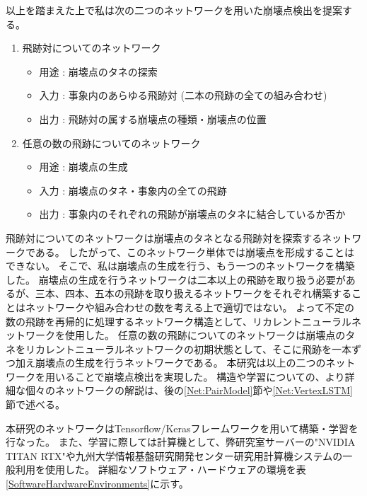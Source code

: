 以上を踏まえた上で私は次の二つのネットワークを用いた崩壊点検出を提案する。

\begin{enumerate}
 \item 飛跡対についてのネットワーク
 \begin{itemize}
  \item 用途 : 崩壊点のタネの探索
  \item 入力 : 事象内のあらゆる飛跡対 (二本の飛跡の全ての組み合わせ)
  \item 出力 : 飛跡対の属する崩壊点の種類・崩壊点の位置
 \end{itemize}
 \item 任意の数の飛跡についてのネットワーク
 \begin{itemize}
  \item 用途 : 崩壊点の生成
  \item 入力 : 崩壊点のタネ・事象内の全ての飛跡
  \item 出力 : 事象内のそれぞれの飛跡が崩壊点のタネに結合しているか否か
 \end{itemize}
\end{enumerate}

飛跡対についてのネットワークは崩壊点のタネとなる飛跡対を探索するネットワークである。
したがって、このネットワーク単体では崩壊点を形成することはできない。
そこで、私は崩壊点の生成を行う、もう一つのネットワークを構築した。
崩壊点の生成を行うネットワークは二本以上の飛跡を取り扱う必要があるが、三本、四本、五本の飛跡を取り扱えるネットワークをそれぞれ構築することはネットワークや組み合わせの数を考える上で適切ではない。
よって不定の数の飛跡を再帰的に処理するネットワーク構造として、リカレントニューラルネットワークを使用した。
任意の数の飛跡についてのネットワークは崩壊点のタネをリカレントニューラルネットワークの初期状態として、そこに飛跡を一本ずつ加え崩壊点の生成を行うネットワークである。
本研究は以上の二つのネットワークを用いることで崩壊点検出を実現した。
構造や学習についての、より詳細な個々のネットワークの解説は、後の\ref{Net:PairModel}節や\ref{Net:VertexLSTM}節で述べる。

本研究のネットワークはTensorflow/Kerasフレームワークを用いて構築・学習を行なった。
また、学習に際しては計算機として、弊研究室サーバーの"NVIDIA TITAN RTX"や九州大学情報基盤研究開発センター研究用計算機システムの一般利用を使用した。
詳細なソフトウェア・ハードウェアの環境を表\ref{SoftwareHardwareEnvironments}に示す。

